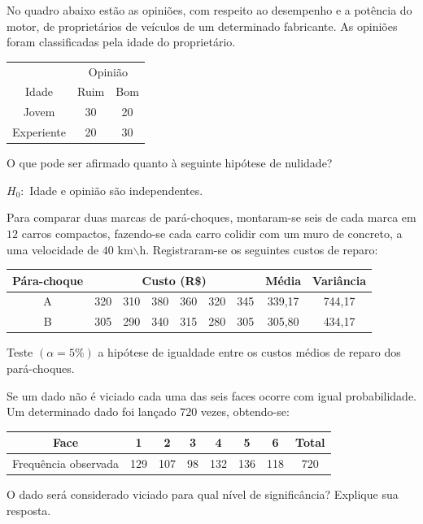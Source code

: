 \documentclass{report}
\begin{document}
\begin{Exercise}
\Question No quadro abaixo estão as opiniões, com respeito ao desempenho e a potência do motor, de proprietários de veículos de um determinado fabricante. 
As opiniões foram classificadas pela idade do proprietário.

\begin{table}[H]
\centering
\begin{tabular}{ccc}
\hline \hline
                                      &\multicolumn{2}{c}{Opinião}\\
																			\cline{2-3}
Idade&Ruim&Bom\\
\hline\hline
Jovem       & 30  &20      \\
Experiente& 20  &30     \\
\hline
\end{tabular}
\end{table}

O que pode ser afirmado quanto à seguinte hipótese de nulidade? 

$H_{0}:$ Idade e opinião são independentes.

\Question Para comparar duas marcas de pará-choques, montaram-se seis de cada marca em $12$ carros compactos, fazendo-se cada carro colidir com um muro 
de concreto, a uma velocidade de $40$ km$\backslash$h. Registraram-se os seguintes custos de reparo:

\begin{table}[H]
\centering
\begin{tabular}{ccccccccc}
\hline \hline
Pára-choque&\multicolumn{6}{c}{Custo (R\$)}&Média & Variância\\
\hline
A       & 320  &310 & 380 & 360 & 320 & 345 & 339,17 & 744,17      \\
B       & 305  &290 & 340 & 315 & 280 & 305 & 305,80 & 434,17     \\
\hline \hline
\end{tabular}
\end{table}

Teste $(\alpha=5\%)$ a hipótese de igualdade entre os custos médios de reparo dos pará-choques.

\Question Se um dado não é viciado cada uma das seis faces ocorre com igual probabilidade. Um determinado dado foi lançado $720$ vezes, obtendo-se:

\begin{table}[H]
\centering
\begin{tabular}{c|ccccccc}
\hline \hline
Face                               &1     &2      & 3   & 4     & 5      & 6     &Total\\
\hline
Frequência observada & 129 &107 & 98 & 132 & 136 & 118 & 720 \\
\hline \hline
\end{tabular}
\end{table}
O dado será considerado viciado para qual nível de significância? Explique sua resposta. 


\end{Exercise}
\end{document}
